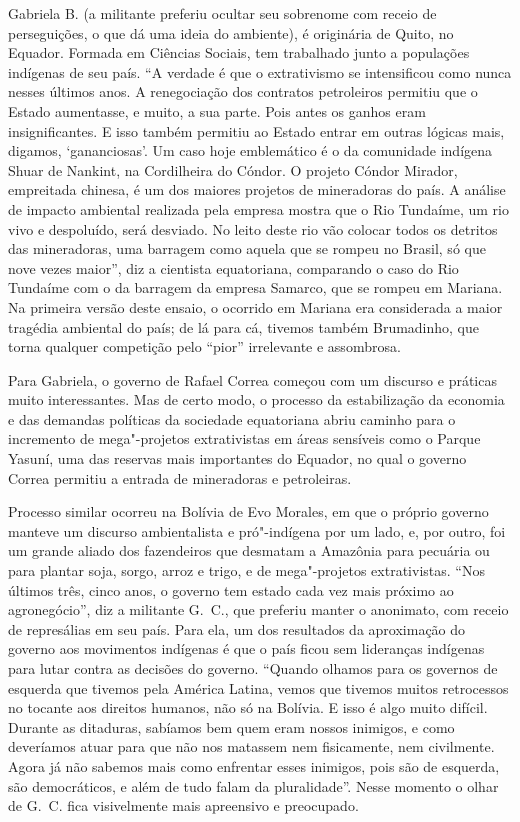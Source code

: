 Gabriela B. (a militante preferiu ocultar seu sobrenome com receio de
perseguições, o que dá uma ideia do ambiente), é originária de
Quito, no Equador. Formada em Ciências Sociais, tem trabalhado junto a
populações indígenas de seu país. ``A verdade é que o extrativismo se
intensificou como nunca nesses últimos anos. A renegociação dos
contratos petroleiros permitiu que o Estado aumentasse, e muito, a sua
parte. Pois antes os ganhos eram insignificantes. E isso também permitiu
ao Estado entrar em outras lógicas mais, digamos, `gananciosas'. Um
caso hoje emblemático é o da comunidade indígena Shuar de Nankint, na
Cordilheira do Cóndor. O projeto Cóndor Mirador, empreitada chinesa, é
um dos maiores projetos de mineradoras do país. A análise de impacto
ambiental realizada pela empresa mostra que o Rio Tundaíme, um rio vivo
e despoluído, será desviado. No leito deste rio vão colocar todos os
detritos das mineradoras, uma barragem como aquela que se rompeu no
Brasil, só que nove vezes maior'', diz a cientista equatoriana,
comparando o caso do Rio Tundaíme com o da barragem da empresa Samarco,
que se rompeu em Mariana. Na primeira versão deste ensaio, o ocorrido em Mariana era considerada a maior tragédia ambiental do país; de lá para cá, tivemos também Brumadinho, que torna qualquer competição pelo ``pior'' irrelevante e assombrosa.

Para Gabriela, o governo de Rafael Correa começou com um discurso e
práticas muito interessantes. Mas de certo modo, o processo da
estabilização da economia e das demandas políticas da sociedade
equatoriana abriu caminho para o incremento de mega"-projetos
extrativistas em áreas sensíveis como o Parque Yasuní, uma das reservas
mais importantes do Equador, no qual o governo Correa permitiu a entrada
de mineradoras e petroleiras.

Processo similar ocorreu na Bolívia de Evo Morales, em que o próprio
governo manteve um discurso ambientalista e pró"-indígena por um lado, e,
por outro, foi um grande aliado dos fazendeiros que desmatam a Amazônia
para pecuária ou para plantar soja, sorgo, arroz e trigo, e de mega"-projetos extrativistas. ``Nos últimos três, cinco anos, o governo tem
estado cada vez mais próximo ao agronegócio'', diz a militante G.~C.,
que preferiu manter o anonimato, com receio de represálias em seu país.
Para ela, um dos resultados da aproximação do governo aos movimentos
indígenas é que o país ficou sem lideranças indígenas para lutar contra
as decisões do governo. ``Quando olhamos para os governos de esquerda
que tivemos pela América Latina, vemos que tivemos muitos retrocessos no
tocante aos direitos humanos, não só na Bolívia. E isso é algo muito
difícil. Durante as ditaduras, sabíamos bem quem eram nossos inimigos, e
como deveríamos atuar para que não nos matassem nem fisicamente, nem
civilmente. Agora já não sabemos mais como enfrentar esses inimigos,
pois são de esquerda, são democráticos, e além de tudo falam da
pluralidade''. Nesse momento o olhar de G.~C. fica visivelmente mais
apreensivo e preocupado.

